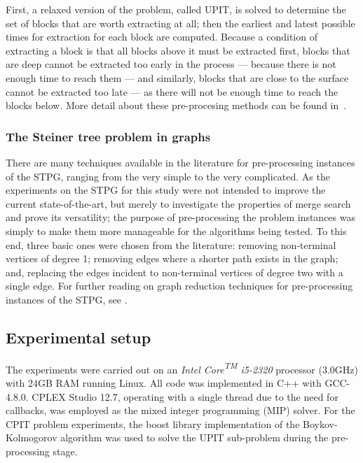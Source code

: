 \documentclass[journal]{IEEEtran}
\begin{document}
First, a relaxed version of the problem, called UPIT, is solved to determine the set of blocks that are worth extracting at all; then the earliest and latest possible times for extraction for each block are computed. Because a condition of extracting a block is that all blocks above it must be extracted first, blocks that are deep cannot be extracted too early in the process --- because there is not enough time to reach them --- and similarly, blocks that are close to the surface cannot be extracted too late --- as there will not be enough time to reach the blocks below. More detail about these pre-procesing methods can be found in~\cite{Kenny:2017}.

\subsubsection*{The Steiner tree problem in graphs}
There are many techniques available in the literature for pre-processing instances of the STPG, ranging from the very simple to the very complicated. As the experiments on the STPG for this study were not intended to improve the current state-of-the-art, but merely to investigate the properties of merge search and prove its versatility; the purpose of pre-processing the problem instances was simply to make them more manageable for the algorithms being tested. To this end, three basic ones were chosen from the literature: removing non-terminal vertices of degree 1; removing edges where a shorter path exists in the graph; and, replacing the edges incident to non-terminal vertices of degree two with a single edge. For further reading on graph reduction techniques for pre-processing instances of the STPG, see \cite{pp:duin,pp:uchoa,stpg-reduce}.

\subsection{Experimental setup}
The experiments were carried out on an \emph{Intel{\textsuperscript{\textregistered}} Core{\textsuperscript{TM}} i5-2320} processor (3.0GHz) with 24GB RAM running Linux. All code was implemented in C++ with GCC-4.8.0. CPLEX Studio 12.7, operating with a single thread due to the need for callbacks, was employed as the mixed integer programming (MIP) solver. For the CPIT problem experiments, the boost library implementation of the Boykov-Kolmogorov algorithm was used to solve the UPIT sub-problem during the pre-processing stage.
\end{document}
